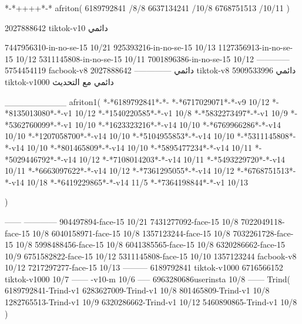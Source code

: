 *-*++++*-*
afriton(
6189792841 /8/8
6637134241 /10/8
6768751513 /10/11
)

2027888642 tiktok-v10
دائمي


7447956310-in-no-se-15 10/21
925393216-in-no-se-15 10/13
1127356913-in-no-se-15 10/12
5311145808-in-no-se-15 10/11
7001896386-in-no-se-15 10/12
------------
5754454119 facbook-v8
دائمي
--------------
2027888642 tiktok-v8
دائمي
5909533996 tiktok-v1000
دائمي مع التحديث

__________
afriton1(
*-*6189792841*-*-
*-*6717029071*-*-v9 10/12
*-*8135013080‌*-*-v1 10/12
*-*1540220585*-*-v1 10/8
*-*5832273497*-*-v1 10/9
*-*5362760099*-*-v1 10/10
*-*1623323216*-*-v14 10/10
*-*6769966286*-*-v14 10/10
*-*1207058700*-*-v14 10/10
*-*5104955853*-*-v14 10/10
*-*5311145808*-*-v14 10/10
*-*801465809*-*-v14 10/10
*-*5895477234*-*-v14 10/11
*-*5029446792*-*-v14 10/12
*-*7108014203*-*-v14 10/11
*-*5493229720*-*-v14 10/11
*-*6663097622*-*-v14 10/12
*-*7361295055*-*-v14 10/12
*-*6768751513*-*-v14 10/18
*-*6419229865*-*-v14 11/5
*-*7364198844*-*-v1 10/13

)

------
------------
904497894-face-15 10/21
7431277092-face-15 10/8
7022049118-face-15 10/8
6040158971-face-15 10/8
1357123244-face-15 10/8
7032261728-face-15 10/8
5998488456-face-15 10/8
6041385565-face-15 10/8
6320286662-face-15 10/9
6751582822-face-15 10/12
5311145808-face-15 10/10
1357123244 facbook-v8 10/12
7217297277-face-15 10/13
---------
6189792841 tiktok-v1000
6716566152 tiktok-v1000
10/7
------
-v10-m 10/6
-----
6963280686userinsta 10/8
------
Trind(
6189792841-Trind-v1 
6283627009-Trind-v1 10/8
801465809-Trind-v1 10/8
1282765513-Trind-v1 10/9
6320286662-Trind-v1 10/12
5460890865-Trind-v1 10/8
)
